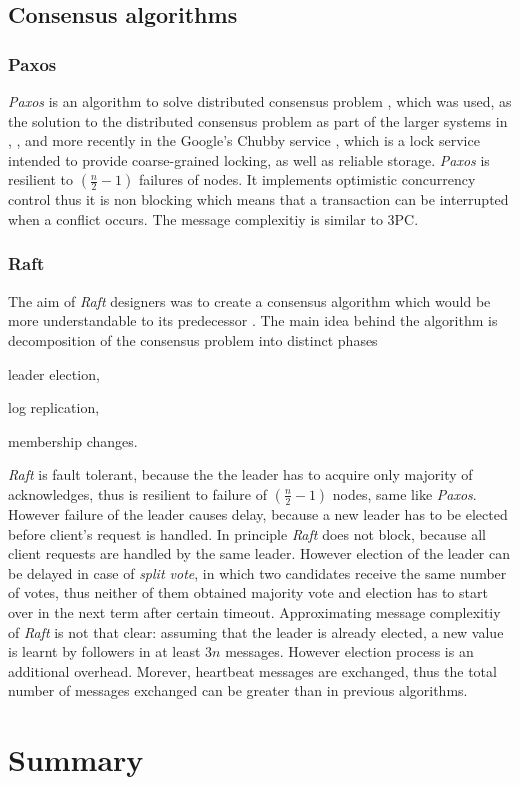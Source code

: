 \documentclass[runningheads,a4paper]{llncs}
\newcommand{\paxos}{\emph{Paxos}\xspace}
\begin{document}
\subsection{Consensus algorithms}

\subsubsection{Paxos}

\paxos is an algorithm to solve distributed consensus problem \cite{Lamport1998partTimeParliment} \cite{lamport2001paxosMadeSimple}, which was used, as the solution to the distributed consensus problem as part of the larger systems in \cite{chandra2007PaxosMadeLive}, \cite{lampson1996build}, and more recently in the Google's Chubby service \cite{burrows2006chubby}, which is a lock service intended to provide coarse-grained locking, as well as reliable storage. \paxos is resilient to $(\frac{n}{2}-1)$ failures of nodes. It implements optimistic concurrency control thus it is non blocking which means that a transaction can be interrupted when a conflict occurs. The message complexitiy is similar to 3PC.

\subsubsection{Raft}

The aim of \emph{Raft} designers was to create a consensus algorithm which would be more understandable to its predecessor \cite{ongaro2014search}. The main idea behind the algorithm is decomposition of the consensus problem into distinct phases \begin{enumerate*}[label=\alph*)]
  \item leader election,
  \item log replication,
  \item membership changes.
\end{enumerate*} 
\emph{Raft} is fault tolerant, because the the leader has to acquire only majority of acknowledges, thus is resilient to failure of $(\frac{n}{2}-1)$ nodes, same like \paxos. However failure of the leader causes delay, because a new leader has to be elected before client's request is handled. In principle \emph{Raft} does not block, because all client requests are handled by the same leader. However election of the leader can be delayed in case of \emph{split vote}, in which two candidates receive the same number of votes, thus neither of them obtained majority vote and election has to start over in the next term after certain timeout. Approximating message complexitiy of \emph{Raft} is not that clear: assuming that the leader is already elected, a new value is learnt by followers in at least $3n$ messages. However election process is an additional overhead. Morever, heartbeat messages are exchanged, thus the total number of messages exchanged can be greater than in previous algorithms.

\section{Summary}



 
\end{document}
